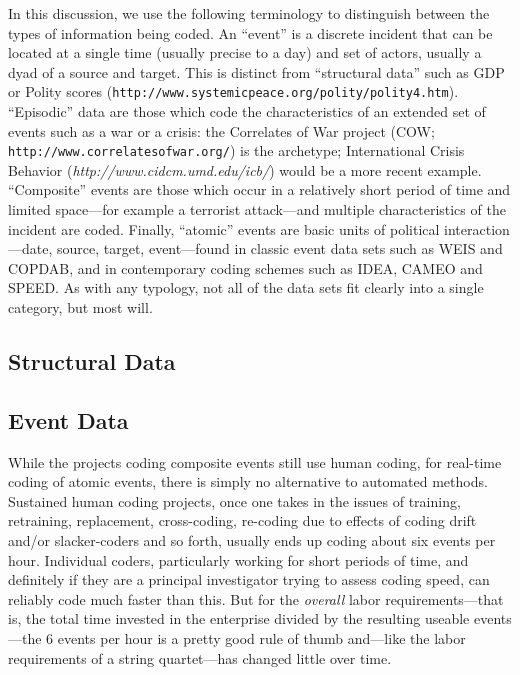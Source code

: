 \documentclass[graybox]{svmult}
\begin{document}
In this discussion, we use the following terminology to distinguish between the types of information being coded. An ``event'' is a discrete incident that can be located at a single time (usually precise to a day) and set of actors, usually a dyad of a source and target. This is distinct from ``structural data'' such as GDP or Polity scores (\texttt{http://www.systemicpeace.org/polity/polity4.htm}). ``Episodic'' data are those which code the characteristics of an extended set of events such as a war or a crisis: the Correlates of War project (COW; \texttt{http://www.correlatesofwar.org/}) is the archetype; International Crisis Behavior (\textit{http://www.cidcm.umd.edu/icb/}) would be a more recent example. ``Composite'' events are those which occur in a relatively short period of time and limited space---for example a terrorist attack---and multiple characteristics of the incident are coded. %
Finally, ``atomic'' %
events are basic units of political interaction---date, source, target, event---found in classic event data sets such as WEIS and COPDAB, and in contemporary coding schemes such as IDEA, CAMEO and SPEED. As with any typology, not all of the data sets fit clearly into a single category, but most will.

\subsection{Structural Data}
\label{subsec:structural}

\subsection{Event Data}
\label{subsec:eventdata}

While the projects coding composite events still use human coding, for real-time coding of atomic events, there is simply no alternative to automated methods. Sustained human coding projects, once one takes in the issues of training, retraining, replacement, cross-coding, re-coding due to effects of coding drift and/or slacker-coders and so forth, usually ends up coding about six events per hour. Individual coders, particularly working for short periods of time, and definitely if they are a principal investigator trying to assess coding speed, can reliably code much faster than this. But for the \textit{overall} labor requirements---that is, the total time invested in the enterprise divided by the resulting useable events---the 6 events per hour is a pretty good rule of thumb and---like the labor requirements of a string quartet---has changed little over time. 
\end{document}
